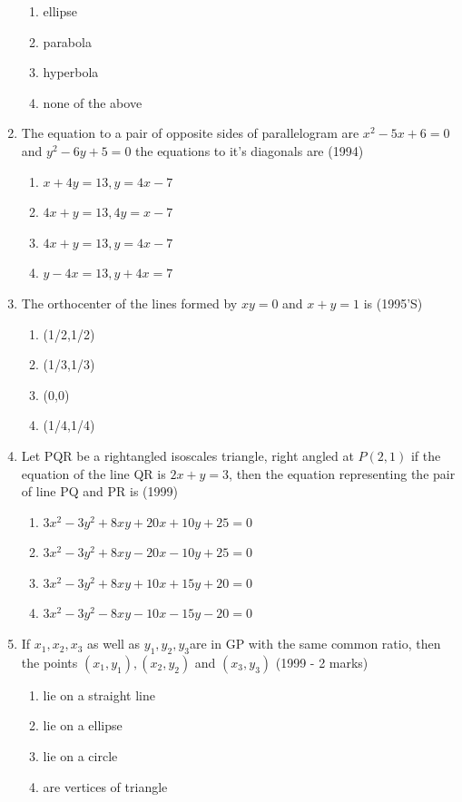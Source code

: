 \documentclass[12pt]{article}
\begin{document}
\begin{enumerate}
\begin{enumerate}
\item ellipse 
\item parabola  
\item hyperbola  
\item none of the above
\end{enumerate}
\item The equation to a pair of  opposite sides of parallelogram are $x^2-5x+6=0$ and $y^2-6y+5=0$ the equations to it's diagonals are (1994)
\begin{enumerate}
\item $x+4y=13, y=4x-7$  
\item $4x+y=13, 4y=x-7$ 
\item $4x+y=13, y=4x-7$
\item $y-4x=13,y+4x=7$ 
\end{enumerate}
\item The orthocenter of the lines formed by $xy=0$ and $x+y=1$ is (1995'S)
\begin{enumerate}
\item (1/2,1/2) 
\item (1/3,1/3) 
\item (0,0)
\item (1/4,1/4)
\end{enumerate}
\item Let PQR be a rightangled isoscales triangle, right angled at $P(2,1)$ if the equation of the line QR is $2x+y=3$, then the equation representing the pair of line PQ and PR is (1999)\\
\begin{enumerate}
\item $3x^2-3y^2+8xy+20x+10y+25=0$
\item $3x^2-3y^2+8xy-20x-10y+25=0$
\item $3x^2-3y^2+8xy+10x+15y+20=0$
\item $3x^2-3y^2-8xy-10x-15y-20=0$
\end{enumerate}
\item If $x_1,x_2,x_3$ as well as $y_1,y_2,y_3 $are in GP with the same common ratio, then the points $(x_1,y_1),(x_2,y_2)$ and $(x_3,y_3)$ (1999 - 2 marks)\\
\begin{enumerate}
\item lie on a straight line 
\item lie on a ellipse 
\item lie on a circle  
\item are vertices of triangle 
\end{enumerate}

\end{enumerate}
\end{document}
